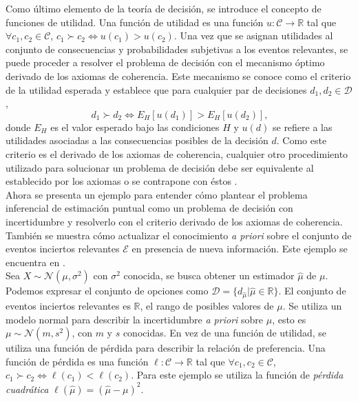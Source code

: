 \documentclass[11pt,a4paper]{article}
\begin{document}
Como último elemento de la teoría de decisión, se introduce el concepto de funciones de utilidad. Una función de utilidad es una función $u: \mathcal{C} \to \mathbb{R}$ tal que $\forall c_1, c_2 \in \mathcal{C}$, $c_1 \succ c_2 \iff u(c_1) > u(c_2)$. Una vez que se asignan utilidades al conjunto de consecuencias y probabilidades subjetivas a los eventos relevantes, se puede proceder a resolver el problema de decisión con el mecanismo óptimo derivado de los axiomas de coherencia. Este mecanismo se conoce como el criterio de la utilidad esperada y establece que para cualquier par de decisiones $d_1, d_2 \in \mathcal{D}$, $$ \ d_1 \succ d_2 \iff E_H[u(d_1)] > E_H[u(d_2)],$$ donde $E_H$ es el valor esperado bajo las condiciones $H$ y $u(d)$ se refiere a las utilidades asociadas a las consecuencias posibles de la decisión $d$. Como este criterio es el derivado de los axiomas de coherencia, cualquier otro procedimiento utilizado para solucionar un problema de decisión debe ser equivalente al establecido por los axiomas o se contrapone con éstos \citep{mendoza}.\\

Ahora se presenta un ejemplo para entender cómo plantear el problema inferencial de estimación puntual como un problema de decisión con incertidumbre y resolverlo con el criterio derivado de los axiomas de coherencia. También se muestra cómo actualizar el conocimiento \textit{a priori} sobre el conjunto de eventos inciertos relevantes $\mathcal{E}$ en presencia de nueva información. Este ejemplo se encuentra en \citet{mendoza}.\\

Sea $X \sim \mathcal{N}(\mu, \sigma^2)$ con $\sigma^2$ conocida, se busca obtener un estimador $\hat{\mu}$ de $\mu$. Podemos expresar el conjunto de opciones como $\mathcal{D} = \lbrace d_{\hat{\mu}} | \hat{\mu} \in \mathbb{R}\rbrace$. El conjunto de eventos inciertos relevantes es $\mathbb{R}$, el rango de posibles valores de $\mu$. Se utiliza un modelo normal para describir la incertidumbre \textit{a priori} sobre $\mu$, esto es $\mu \sim \mathcal{N}(m, s^2)$, con $m$ y $s$ conocidas. En vez de una función de utilidad, se utiliza una función de pérdida para describir la relación de preferencia. Una función de pérdida es una función $\ell : \mathcal{C} \to \mathbb{R}$ tal que $\forall c_1, c_2 \in \mathcal{C}$, $c_1 \succ c_2 \iff \ell (c_1) < \ell (c_2)$. Para este ejemplo se utiliza la función de \textit{pérdida cuadrática} $\ell (\hat{\mu}) = (\hat{\mu} - \mu)^2$. \\
\end{document}

